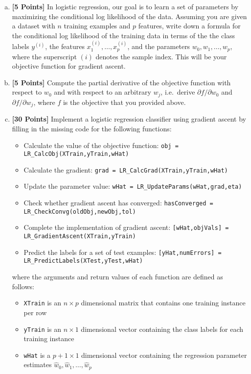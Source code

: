 \documentclass{article}
\newcommand \code [1]{{\tt #1}}
\begin{document}
\begin{enumerate}[(a)]
\item {\bf [5 Points]} In logistic regression, our goal is to learn a set of parameters by maximizing the conditional log likelihood of the data. Assuming you are given a dataset with $n$ training examples and $p$ features, write down a formula for the conditional log likelihood of the training data in terms of the the class labels $y^{(i)}$, the features $x^{(i)}_1, \ldots, x^{(i)}_p$, and the parameters $w_0, w_1, \ldots, w_p$, where the superscript $(i)$ denotes the sample index. This will be your objective function for gradient ascent. 
\item {\bf [5 Points]} Compute the partial derivative of the objective function with respect to $w_0$ and with respect to an arbitrary $w_j$, i.e.~derive $\partial f / \partial w_0$ and $\partial f / \partial w_j$, where $f$ is the objective that you provided above.
\item {\bf [30 Points]} Implement a logistic regression classifier using gradient ascent by filling in the missing code for the following functions: 
\begin{itemize}
\item Calculate the value of the objective function: \code{obj = LR\_CalcObj(XTrain,yTrain,wHat)}
\item Calculate the gradient: \code{grad = LR\_CalcGrad(XTrain,yTrain,wHat)}
\item Update the parameter value: \code{wHat = LR\_UpdateParams(wHat,grad,eta)}
\item Check whether gradient ascent has converged: \code{hasConverged = LR\_CheckConvg(oldObj,newObj,tol)}
\item Complete the implementation of gradient ascent: \code{[wHat,objVals] = LR\_GradientAscent(XTrain,yTrain)}
\item Predict the labels for a set of test examples: \code{[yHat,numErrors] = LR\_PredictLabels(XTest,yTest,wHat)}
\end{itemize}
where the arguments and return values of each function are defined as follows:
\begin{itemize}
\item \code{XTrain} is an $n \times p$ dimensional matrix that contains one training instance per row
\item \code{yTrain} is an $n \times 1$ dimensional vector containing the class labels for each training instance
\item \code{wHat} is a $p+1 \times 1$ dimensional vector containing the regression parameter estimates $\hat{w}_0, \hat{w}_1, \ldots, \hat{w}_p$

\end{itemize}
\end{enumerate}
\end{document}

